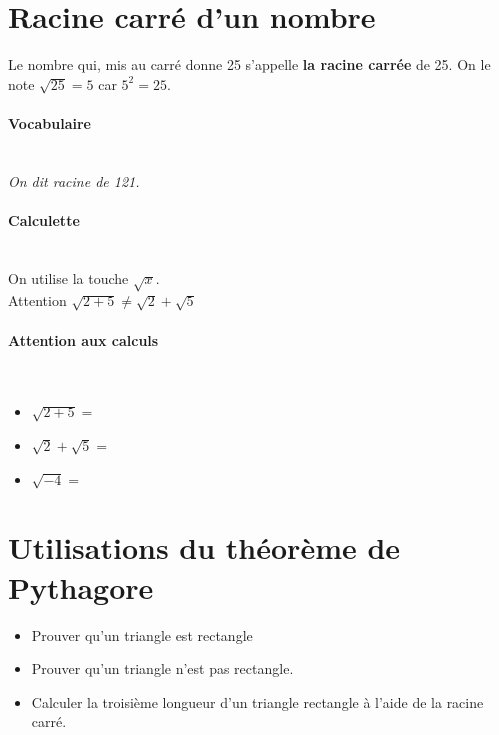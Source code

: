 \documentclass[paper=a4, fontsize=9pt]{scrartcl} %
\begin{document}
\begin{multicols}{2}

\section{Racine carré d'un nombre}

  \begin{Definition}
    Le nombre qui, mis au carré donne 25 s’appelle \textbf{la racine carrée} de 25. On le note $\sqrt{25} = 5$ car $5^2 = 25$.
  \end{Definition}

  \paragraph{Vocabulaire}~~\\
  \textit{On dit racine de 121.}

  \paragraph{Calculette}~~\\
  On utilise la touche $\sqrt{x}$.\\
  Attention $\sqrt{2 + 5} \neq \sqrt{2} + \sqrt{5}$
  

	\paragraph{Attention aux calculs}~~\\

    \begin{itemize}
    \item $\sqrt{2 + 5} = $
    \item $\sqrt{2} + \sqrt{5}= $
    \item $\sqrt{-4} = $
   \end{itemize}


  \section{Utilisations du théorème de Pythagore}
    
    \begin{itemize}	
    \item Prouver qu'un triangle est rectangle
    \item Prouver qu'un triangle n'est pas rectangle. 
    \item Calculer la troisième longueur d'un triangle rectangle à l'aide de la racine carré.
    \end{itemize}
  
\end{multicols}
\end{document}
